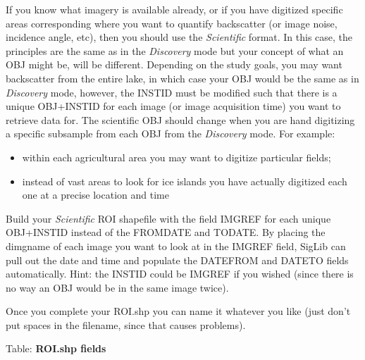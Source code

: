 \documentclass[letterpaper,10pt,openany,oneside]{sphinxmanual}
\begin{document}
If you know what imagery is available already, or if you have digitized
specific areas corresponding where you want to quantify backscatter (or
image noise, incidence angle, etc), then you should use the \emph{Scientific}
format. In this case, the principles are the same as in the \emph{Discovery}
mode but your concept of what an OBJ might be, will be different.
Depending on the study goals, you may want backscatter from the entire
lake, in which case your OBJ would be the same as in \emph{Discovery} mode,
however, the INSTID must be modified such that there is a unique
OBJ+INSTID for each image (or image acquisition time) you want to
retrieve data for. The scientific OBJ should change when you are hand
digitizing a specific subsample from each OBJ from the \emph{Discovery} mode.
For example:
\begin{itemize}
\item {} 
within each agricultural area you may want to digitize particular
fields;

\item {} 
instead of vast areas to look for ice islands you have actually
digitized each one at a precise location and time

\end{itemize}

Build your \emph{Scientific} ROI shapefile with the field IMGREF for each
unique OBJ+INSTID instead of the FROMDATE and TODATE. By placing the
dimgname of each image you want to look at in the IMGREF field, SigLib
can pull out the date and time and populate the DATEFROM and DATETO
fields automatically. Hint: the INSTID could be IMGREF if you wished
(since there is no way an OBJ would be in the same image twice).

Once you complete your ROI.shp you can name it whatever you like (just
don't put spaces in the filename, since that causes problems).

Table: \textbf{ROI.shp fields}
\end{document}
